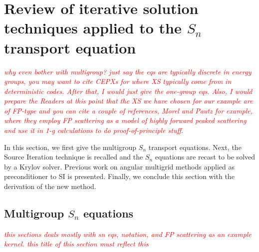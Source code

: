 \documentclass[preprint,10pt]{elsarticle}
\renewcommand{\(}{\left(}
\renewcommand{\)}{\right)}
\renewcommand{\[}{\left[}
\renewcommand{\]}{\right]}
\newcommand{\tri}[1]{\textcolor{red}{{\it #1}}}
\begin{document}
\section{Review of iterative solution techniques applied to the $S_n$ transport equation}

\tri{why even bother with multigroup? just say the eqs are typically discrete in energy groups, you may want to cite CEPXs for
where XS typically come from in deterministic codes. After that, I would just give the one-group eqs. Also, I would prepare the Readers at this point that the XS we have chosen for our example are of FP-type and you can cite a couple of references, Morel and Pautz for example, where they employ FP scattering as a model of highly forward peaked scattering and use it in 1-g calculations to do proof-of-principle stuff}.

In this section, we first give the multigroup $S_n$ transport equations. Next,
the Source Iteration technique is recalled and the $S_n$ equations are
recast to be solved by a Krylov solver. Previous work on angular
multigrid methods applied as preconditioner to SI is presented. Finally, we
conclude this section with the derivation of the new method.  

\subsection{Multigroup $S_n$ equations} \label{sec:sn_eqs}
\tri{this sections deals mostly with sn eqs, notation, and FP scattering as an example kernel. this title of this section must reflect this}
\end{document}
